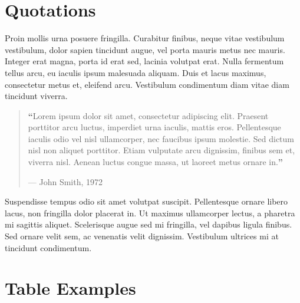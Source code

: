 \documentclass[
	a4paper, %
	11pt, %
]{DC_Report}
\begin{document}

\section{Quotations}

Proin mollis urna posuere fringilla. Curabitur finibus, neque vitae vestibulum vestibulum, dolor sapien tincidunt augue, vel porta mauris metus nec mauris. Integer erat magna, porta id erat sed, lacinia volutpat erat. Nulla fermentum tellus arcu, eu iaculis ipsum malesuada aliquam. Duis et lacus maximus, consectetur metus et, eleifend arcu. Vestibulum condimentum diam vitae diam tincidunt viverra. %

\begin{quote}
	\textbf{\LARGE ``}Lorem ipsum dolor sit amet, consectetur adipiscing elit. Praesent porttitor arcu luctus, imperdiet urna iaculis, mattis eros. Pellentesque iaculis odio vel nisl ullamcorper, nec faucibus ipsum molestie. Sed dictum nisl non aliquet porttitor. Etiam vulputate arcu dignissim, finibus sem et, viverra nisl. Aenean luctus congue massa, ut laoreet metus ornare in.\textbf{''}
	
	\hfill--- John Smith, 1972
\end{quote}

Suspendisse tempus odio sit amet volutpat suscipit. Pellentesque ornare libero lacus, non fringilla dolor placerat in. Ut maximus ullamcorper lectus, a pharetra mi sagittis aliquet. Scelerisque augue sed mi fringilla, vel dapibus ligula finibus. Sed ornare velit sem, ac venenatis velit dignissim. Vestibulum ultrices mi at tincidunt condimentum.


\section{Table Examples}
\end{document}
